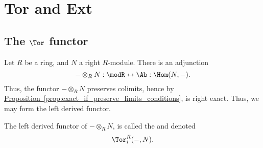 \documentclass[main.tex]{subfiles}
\begin{document}
\chapter{Tor and Ext}
\label{ch:applications}

\section{The \texorpdfstring{$\Tor$}{Tor} functor}
\label{sec:tor}

Let $R$ be a ring, and $N$ a right $R$-module. There is an adjunction
\begin{equation*}
  - \otimes_{R} N : \modR \leftrightarrow \Ab : \Hom(N, -).
\end{equation*}
Thus, the functor $- \otimes_{R} N$ preserves colimits, hence by \hyperref[prop:exact_if_preserve_limits_conditions]{Proposition~\ref*{prop:exact_if_preserve_limits_conditions}}, is right exact. Thus, we may form the left derived functor.

\begin{definition}
  \label{def:tor_functor}
  The left derived functor of $- \otimes_{R} N$, is called the  and denoted
  \begin{equation*}
    \Tor_{i}^{R}(-, N).
  \end{equation*}
\end{definition}
\end{document}
